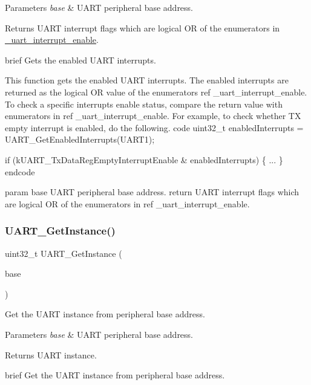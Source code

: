 \begin{DoxyParams}{Parameters}
{\em base} & U\+A\+RT peripheral base address. \\
\hline
\end{DoxyParams}
\begin{DoxyReturn}{Returns}
U\+A\+RT interrupt flags which are logical OR of the enumerators in \mbox{\hyperlink{group__uart__driver_ga700f3cd8e3800273a1591307cab6311c}{\+\_\+uart\+\_\+interrupt\+\_\+enable}}.
\end{DoxyReturn}
brief Gets the enabled U\+A\+RT interrupts.

This function gets the enabled U\+A\+RT interrupts. The enabled interrupts are returned as the logical OR value of the enumerators ref \+\_\+uart\+\_\+interrupt\+\_\+enable. To check a specific interrupts enable status, compare the return value with enumerators in ref \+\_\+uart\+\_\+interrupt\+\_\+enable. For example, to check whether TX empty interrupt is enabled, do the following. code uint32\+\_\+t enabled\+Interrupts = U\+A\+R\+T\+\_\+\+Get\+Enabled\+Interrupts(\+U\+A\+R\+T1);

if (k\+U\+A\+R\+T\+\_\+\+Tx\+Data\+Reg\+Empty\+Interrupt\+Enable \& enabled\+Interrupts) \{ ... \} endcode

param base U\+A\+RT peripheral base address. return U\+A\+RT interrupt flags which are logical OR of the enumerators in ref \+\_\+uart\+\_\+interrupt\+\_\+enable. \mbox{\label{group__uart__driver_gadeeb40cdc314638d4355ef906f1c408d}} 
\subsubsection{\texorpdfstring{UART\_GetInstance()}{UART\_GetInstance()}}
{\footnotesize\ttfamily uint32\+\_\+t U\+A\+R\+T\+\_\+\+Get\+Instance (\begin{DoxyParamCaption}\item[{\mbox{\hyperlink{struct_u_a_r_t___type}{U\+A\+R\+T\+\_\+\+Type}} $\ast$}]{base }\end{DoxyParamCaption})}



Get the U\+A\+RT instance from peripheral base address. 


\begin{DoxyParams}{Parameters}
{\em base} & U\+A\+RT peripheral base address. \\
\hline
\end{DoxyParams}
\begin{DoxyReturn}{Returns}
U\+A\+RT instance.
\end{DoxyReturn}
brief Get the U\+A\+RT instance from peripheral base address.

